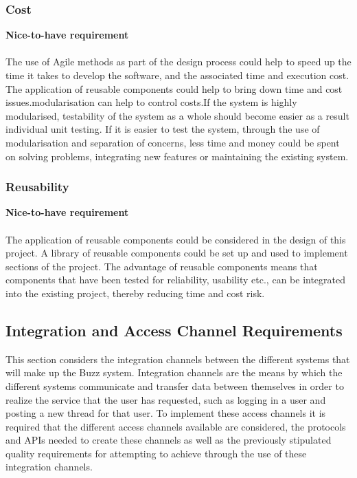 \documentclass[a4paper]{article}
\begin{document}
\subsubsection{Cost}
\textbf{Nice-to-have requirement}
\\
\\The use of Agile methods as part of the design process could help to speed up the time it takes to develop the software, and the associated time and execution cost. The application of reusable components could help to bring down time and cost issues.modularisation can help to control costs.If the system is highly modularised, testability of the system as a whole should become easier as a result individual unit testing. If it is easier to test the system, through the use of modularisation and separation of concerns, less time and money could be spent on solving problems, integrating new features or maintaining the existing system.

\subsubsection{Reusability }
\textbf{Nice-to-have requirement}
\\
\\The application of reusable components could be considered in the design of this project. A library of reusable components could be set up and used to implement sections of the project. The advantage of reusable components means that components that have been tested for reliability, usability etc., can be integrated into the existing project, thereby reducing time and cost risk.

\subsection{Integration and Access Channel Requirements}
This section considers the integration channels between the different systems that will make up the Buzz system. Integration channels are the means by which the different systems communicate and transfer data between themselves in order to realize the service that the user has requested, such as logging in a user and posting a new thread for that user. To implement these
access channels it is required that the different access channels available are considered, the protocols and APIs needed to create these channels as well as the previously stipulated quality requirements for attempting to achieve through the use of these integration channels.
\end{document}
